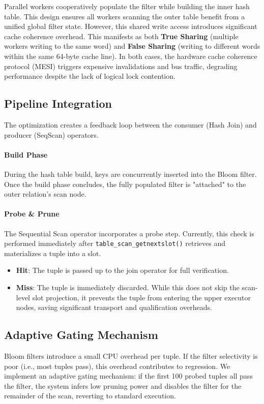 \documentclass[sigconf,nonacm]{acmart}
\begin{document}
Parallel workers cooperatively populate the filter while building the inner hash table. This design ensures all workers scanning the outer table benefit from a unified global filter state. However, this shared write access introduces significant cache coherence overhead. This manifests as both \textbf{True Sharing} (multiple workers writing to the same word) and \textbf{False Sharing} (writing to different words within the same 64-byte cache line). In both cases, the hardware cache coherence protocol (MESI) triggers expensive invalidations and bus traffic, degrading performance despite the lack of logical lock contention.

\subsection{Pipeline Integration}
The optimization creates a feedback loop between the consumer (Hash Join) and producer (SeqScan) operators.
\paragraph{Build Phase}
During the hash table build, keys are concurrently inserted into the Bloom filter. Once the build phase concludes, the fully populated filter is "attached" to the outer relation's scan node.

\paragraph{Probe \& Prune}
The Sequential Scan operator incorporates a probe step. Currently, this check is performed immediately after \texttt{table\_scan\_getnextslot()} retrieves and materializes a tuple into a slot.
\begin{itemize}
    \item \textbf{Hit}: The tuple is passed up to the join operator for full verification.
    \item \textbf{Miss}: The tuple is immediately discarded. While this does not skip the scan-level slot projection, it prevents the tuple from entering the upper executor nodes, saving significant transport and qualification overheads.
\end{itemize}

\subsection{Adaptive Gating Mechanism}
Bloom filters introduce a small CPU overhead per tuple. If the filter selectivity is poor (i.e., most tuples pass), this overhead contributes to regression. We implement an adaptive gating mechanism: if the first 100 probed tuples all pass the filter, the system infers low pruning power and disables the filter for the remainder of the scan, reverting to standard execution.
\end{document}
